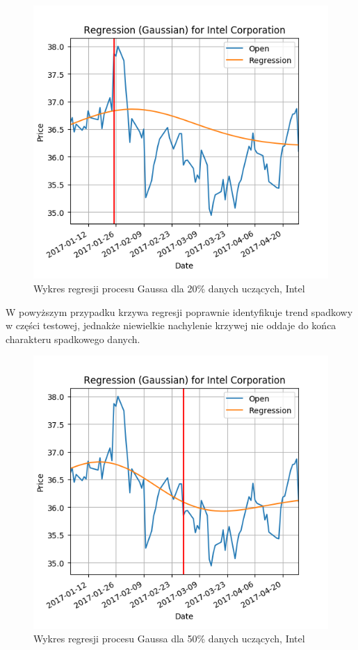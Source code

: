 \begin{figure}[h!]
\centering
\includegraphics[width=150mm]{pictures/plots/intel_gpr_20.png}
\caption{Wykres regresji procesu Gaussa dla 20\% danych uczących, Intel}
\label{fig:intel_gpr_20}
\end{figure}

W powyższym przypadku krzywa regresji poprawnie identyfikuje trend spadkowy w części testowej, jednakże niewielkie nachylenie krzywej nie oddaje do końca charakteru spadkowego danych.\\ 

\begin{figure}[h!]
\centering
\includegraphics[width=150mm]{pictures/plots/intel_gpr_50.png}
\caption{Wykres regresji procesu Gaussa dla 50\% danych uczących, Intel}
\label{fig:intel_gpr_50}
\end{figure}

